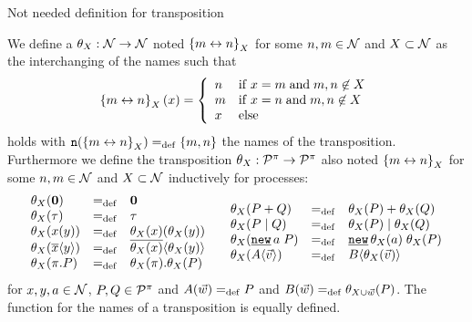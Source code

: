 \begin{old}{Not needed definition for transposition}
\begin{definition}[Transposition]
\label{def_transposition}
	We define a  $\theta_X:\mathcal N\rightarrow\mathcal N$ noted $\left\{m\leftrightarrow{}n\right\}_X$ for some $n,m\in\mathcal N$ and $X\subset\mathcal N$ as the interchanging of the names such that
	\[\left\{m\leftrightarrow{}n\right\}_X\left(x\right) =\left\{\begin{array}{ll}
					n & \mathrm{if}\; x=m \;\text{and} \; m,n\not\in{}X\\
					m & \mathrm{if}\; x=n \;\text{and} \; m,n\not\in{}X\\
					x & \text{else}
					\end{array}
				\right.\]
	holds with $\n{\transp{m}{n}_X}\define\set{m,n}$ the names of the transposition. Furthermore we define the transposition $\theta_X:\mathcal P^{\pi}\rightarrow\mathcal P^{\pi}$ also noted $\left\{m\leftrightarrow{}n\right\}_X$ for some $n,m\in\mathcal N$ and $X\subset\mathcal N$ inductively for processes:
	\begin{equation*}	
		\begin{aligned}			
			\begin{array}{lcl}
				\transpT{X}{\proczero} & \define & \proczero \\
				\transpT{X}{\tau} & \define & \tau \\
				\transpT{X}{\inp{x}{y}} & \define & \inp{\transpT{X}{x}}{\transpT{X}{y}} \\
				\transpT{X}{\out{x}{y}} & \define & \out{\transpT{X}{x}}{\transpT{X}{y}} \\
				\transpT{X}{\pi.P} & \define & \transpT{X}{\pi}.\transpT{X}{P} \\
			\end{array}
		\end{aligned}\quad
		\begin{aligned}
			\begin{array}{lcl}
				\transpT{X}{\procchoice{P}{Q}} & \define & \procchoice{\transpT{X}{P}}{\transpT{X}{Q}} \\
				\transpT{X}{\procpar{P}{Q}} & \define & \procpar{\transpT{X}{P}}{\transpT{X}{Q}} \\
				\transpT{X}{\procres{a}{P}} & \define & \procres{\transpT{X}{a}}{\transpT{X}{P}} \\
				\transpT{X}{\proccall{A}{\vec{v}}} & \define & \proccall{B}{\transpT{X}{\vec{v}}} \\
			\end{array}
		\end{aligned}
	\end{equation*}
for $x,y,a\in\mathcal N$, $P,Q\in\mathcal P^{\pi}$ and $A(\vec{w})=_{\mathrm{def}}{}P$ and $B(\vec{w})=_{\mathrm{def}}{}\theta_{X\cup\vec{w}}(P)$. The function for the names of a transposition is  equally defined.
\end{definition}
\end{old}

